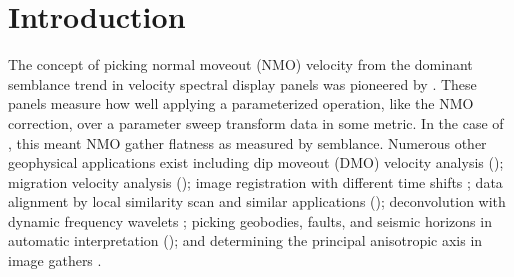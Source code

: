 \section{Introduction}


The concept of picking normal moveout (NMO) velocity from the dominant semblance trend in velocity spectral display panels was pioneered by \cite{taner-1969}.   These panels measure how well applying a parameterized operation, like the NMO correction, over a parameter sweep transform data in some metric.  In the case of \cite{taner-1969}, this meant NMO gather flatness as measured by semblance. Numerous other geophysical applications exist including dip moveout (DMO) velocity analysis (\citealp{hale-1984,deregowski-1986,yilmaz-2001}); migration velocity analysis (\citealp{fowler-1988,deregowski-1990,fomelvelcon,deckerovc,decker-prob-diff}); image registration with different time shifts \cite[]{hale-2013}; data alignment by local similarity scan and similar applications (\citealp{attr,fomelvelanal,bader-2019}); deconvolution with dynamic frequency wavelets \cite[]{decker-decon}; picking geobodies, faults, and seismic horizons in automatic interpretation (\citealp{wu-2018,wu2018least,yan-2021}); and determining the principal anisotropic axis in image gathers \cite[]{decker-dtw}.

